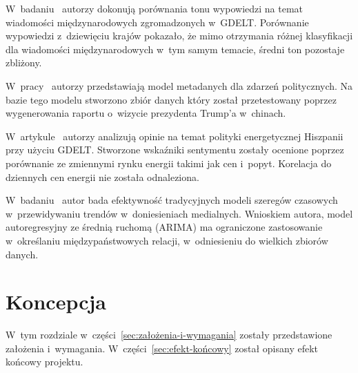 \documentclass[11pt]{report}
\begin{document}
    W~badaniu~\cite{Ma2017} autorzy dokonują porównania tonu wypowiedzi na temat wiadomości międzynarodowych zgromadzonych w~GDELT.
    Porównanie wypowiedzi z~dziewięciu krajów pokazało, że mimo otrzymania różnej klasyfikacji dla wiadomości międzynarodowych w~tym samym temacie, średni ton pozostaje zbliżony.

    W~pracy~\cite{Wang2018} autorzy przedstawiają model metadanych dla zdarzeń politycznych.
    Na bazie tego modelu stworzono zbiór danych który został przetestowany poprzez wygenerowania raportu o~wizycie prezydenta Trump'a w~chinach.

    W~artykule~\cite{Bodas-Sagi2016} autorzy analizują opinie na temat polityki energetycznej Hiszpanii przy użyciu GDELT.
    Stworzone wskaźniki sentymentu zostały ocenione poprzez porównanie ze zmiennymi rynku energii takimi jak cen i~popyt.
    Korelacja do dziennych cen energii nie została odnaleziona.

    W~badaniu~\cite{Yuan2017a} autor bada efektywność tradycyjnych modeli szeregów czasowych w~przewidywaniu trendów w~doniesieniach medialnych.
    Wnioskiem autora, model autoregresyjny ze średnią ruchomą (ARIMA) ma ograniczone zastosowanie w~określaniu międzypaństwowych relacji, w~odniesieniu do wielkich zbiorów danych.


    \chapter{Koncepcja}\label{ch:koncepcja}

    W~tym rozdziale w~części~\ref{sec:założenia-i-wymagania} zostały przedstawione założenia i~wymagania.
    W~części~\ref{sec:efekt-końcowy} został opisany efekt końcowy projektu.
\end{document}
